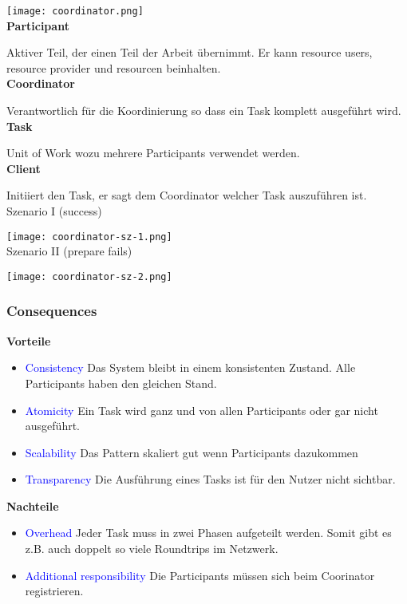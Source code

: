 \texttt{[image: coordinator.png]} \\

\textbf{Participant}

Aktiver Teil, der einen Teil der Arbeit übernimmt. Er kann resource users, resource provider und resourcen beinhalten. \\

\textbf{Coordinator}

Verantwortlich für die Koordinierung so dass ein Task komplett ausgeführt wird. \\

\textbf{Task}

Unit of Work wozu mehrere Participants verwendet werden. \\

\textbf{Client}

Initiiert den Task, er sagt dem Coordinator welcher Task auszuführen ist. \\

Szenario I (success)

\texttt{[image: coordinator-sz-1.png]} \\

Szenario II (prepare fails)

\texttt{[image: coordinator-sz-2.png]}


\subsubsection{Consequences}

\textbf{Vorteile}

\begin{itemize}
    \item \textcolor{blue}{Consistency} Das System bleibt in einem konsistenten Zustand. Alle Participants haben den gleichen Stand.
    \item \textcolor{blue}{Atomicity} Ein Task wird ganz und von allen Participants oder gar nicht ausgeführt.
    \item \textcolor{blue}{Scalability} Das Pattern skaliert gut wenn Participants dazukommen
    \item \textcolor{blue}{Transparency} Die Ausführung eines Tasks ist für den Nutzer nicht sichtbar.
\end{itemize}
\vspace{10pt}
\textbf{Nachteile}

\begin{itemize}
    \item \textcolor{blue}{Overhead} Jeder Task muss in zwei Phasen aufgeteilt werden. Somit gibt es z.B. auch doppelt so viele Roundtrips im Netzwerk.
    \item \textcolor{blue}{Additional responsibility} Die Participants müssen sich beim Coorinator registrieren.
\end{itemize}

